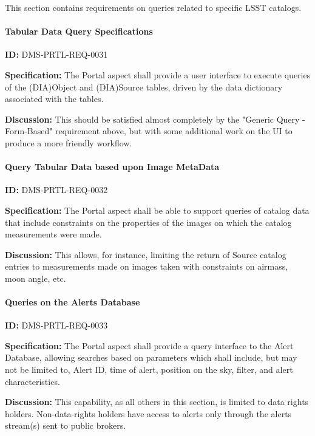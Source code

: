 \documentclass[SE,toc,lsstdraft]{lsstdoc}
\begin{document}
This section contains requirements on queries related to specific LSST catalogs.

\paragraph{Tabular Data Query Specifications}\hfill  %

\label{DMS-PRTL-REQ-0031}
\textbf{ID:} DMS-PRTL-REQ-0031

\textbf{Specification:}
The Portal aspect shall provide a user interface to execute queries of the (DIA)Object and (DIA)Source tables, driven by the data dictionary associated with the tables.

\textbf{Discussion:}
This should be satisfied almost completely by the "Generic Query - Form-Based" requirement above, but with some additional work on the UI to produce a more friendly workflow.

\paragraph{Query Tabular Data based upon Image MetaData}\hfill  %

\label{DMS-PRTL-REQ-0032}
\textbf{ID:} DMS-PRTL-REQ-0032

\textbf{Specification:}
The Portal aspect shall be able to support queries of catalog data that include constraints on the properties of the images on which the catalog measurements were made.

\textbf{Discussion:}
This allows, for instance, limiting the return of Source catalog entries to measurements made on images taken with constraints on airmass, moon angle, etc.

\paragraph{Queries on the Alerts Database}\hfill  %

\label{DMS-PRTL-REQ-0033}
\textbf{ID:} DMS-PRTL-REQ-0033

\textbf{Specification:}
The Portal aspect shall provide a query interface to the Alert Database, allowing searches based on parameters which shall include, but may not be limited to, Alert ID, time of alert, position on the sky, filter, and alert characteristics.

\textbf{Discussion:}
This capability, as all others in this section, is limited to data rights holders.  Non-data-rights holders have access to alerts only through the alerts stream(s) sent to public brokers.
\end{document}
